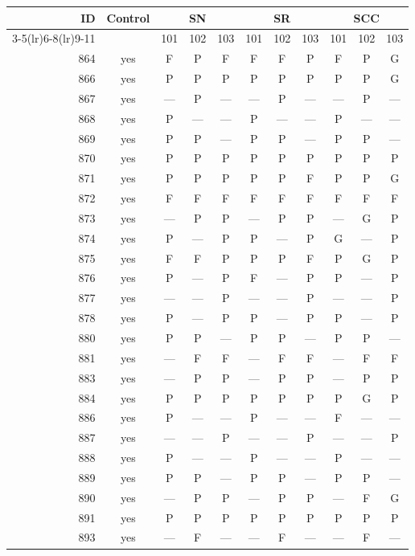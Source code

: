 \begin{table}[p]\centering\small
\begin{tabular*}{\textwidth}{@{\extracolsep{\fill}}rc*{9}{c}@{}}\toprule
ID & Control & \multicolumn{3}{c}{SN} & \multicolumn{3}{c}{SR} & \multicolumn{3}{c}{SCC}\\
\cmidrule(lr){3-5}\cmidrule(lr){6-8}\cmidrule(lr){9-11}
 & & 101 & 102 & 103 & 101 & 102 & 103 & 101 & 102 & 103\\\midrule
864 & yes & F & P & F & F & F & P & F & P & G\\
866 & yes & P & P & P & P & P & P & P & P & G\\
867 & yes & — & P & — & — & P & — & — & P & —\\
868 & yes & P & — & — & P & — & — & P & — & —\\
869 & yes & P & P & — & P & P & — & P & P & —\\
870 & yes & P & P & P & P & P & P & P & P & P\\
871 & yes & P & P & P & P & P & F & P & P & G\\
872 & yes & F & F & F & F & F & F & F & F & F\\
873 & yes & — & P & P & — & P & P & — & G & P\\
874 & yes & P & — & P & P & — & P & G & — & P\\
875 & yes & F & F & P & P & P & F & P & G & P\\
876 & yes & P & — & P & F & — & P & P & — & P\\
877 & yes & — & — & P & — & — & P & — & — & P\\
878 & yes & P & — & P & P & — & P & P & — & P\\
880 & yes & P & P & — & P & P & — & P & P & —\\
881 & yes & — & F & F & — & F & F & — & F & F\\
883 & yes & — & P & P & — & P & P & — & P & P\\
884 & yes & P & P & P & P & P & P & P & G & P\\
886 & yes & P & — & — & P & — & — & F & — & —\\
887 & yes & — & — & P & — & — & P & — & — & P\\
888 & yes & P & — & — & P & — & — & P & — & —\\
889 & yes & P & P & — & P & P & — & P & P & —\\
890 & yes & — & P & P & — & P & P & — & F & G\\
891 & yes & P & P & P & P & P & P & P & P & P\\
893 & yes & — & F & — & — & F & — & — & F & —\\

\end{tabular*}
\end{table}
